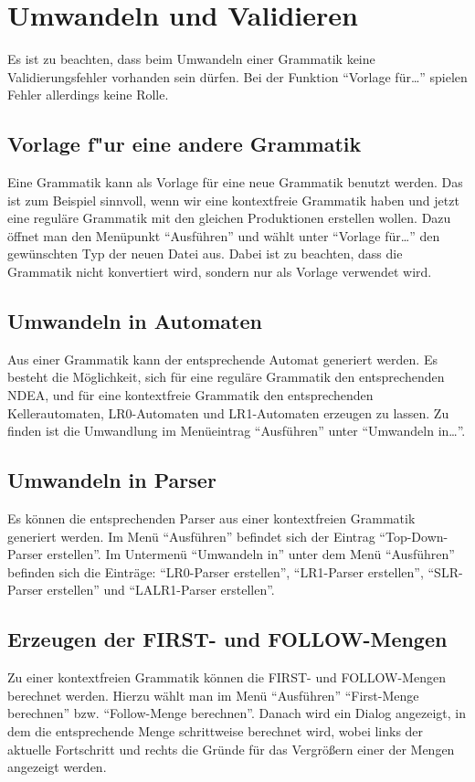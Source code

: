 \section{Umwandeln und Validieren}

Es ist zu beachten, dass beim Umwandeln einer Grammatik keine
Validierungsfehler vorhanden sein dürfen. Bei der Funktion "`Vorlage
für\ldots"' spielen Fehler allerdings keine Rolle.

\subsection{Vorlage f"ur eine andere Grammatik}
Eine Grammatik kann als Vorlage für eine neue Grammatik benutzt werden.
Das ist zum Beispiel sinnvoll, wenn wir eine kontextfreie Grammatik
haben und jetzt eine reguläre Grammatik mit den gleichen Produktionen
erstellen wollen. Dazu öffnet man den Menüpunkt "`Ausführen"' und wählt unter
"`Vorlage für\ldots"' den gewünschten Typ der neuen Datei aus.
Dabei ist zu beachten, dass die Grammatik nicht konvertiert wird,
sondern nur als Vorlage verwendet wird.\vspace{10pt}

\subsection{Umwandeln in Automaten}
Aus einer Grammatik kann der ent\-sprechen\-de Automat generiert werden.
Es besteht die Möglichkeit,
sich für eine reguläre Grammatik den entsprechenden NDEA, und für eine
kontextfreie Grammatik den entsprechenden Kellerautomaten, LR0-Automaten und
LR1-Automaten erzeugen zu lassen. Zu finden ist die Umwandlung im Menüeintrag "`Ausführen"'
unter "`Umwandeln in\ldots"'.\vspace{10pt}

\subsection{Umwandeln in Parser}
Es können die entsprechenden Parser aus einer kontextfreien Grammatik generiert werden.
Im Menü "`Ausführen"' befindet sich der Eintrag "`Top-Down-Parser erstellen"'.
Im Untermenü "`Umwandeln in"' unter dem Menü "`Ausführen"' befinden sich die Einträge:
"`LR0-Parser erstellen"', "`LR1-Parser erstellen"', "`SLR-Parser erstellen"' und
"`LALR1-Parser erstellen"'.

\subsection{Erzeugen der FIRST- und FOLLOW-Mengen}
Zu einer kontextfreien Grammatik können die FIRST- und FOLLOW-Mengen 
berechnet werden. Hierzu wählt man im Menü "`Ausführen"' "`First-Menge berechnen"'
bzw. "`Follow-Menge berechnen"'. Danach wird ein Dialog angezeigt, in dem die
entsprechende Menge schrittweise berechnet wird, wobei links der aktuelle Fortschritt
und rechts die Gründe für das Vergrößern einer der Mengen angezeigt werden.


